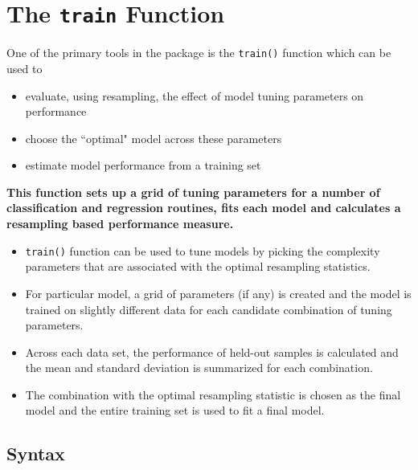 \documentclass[caret-main.tex]{subfiles}
\begin{document}
\section*{The \texttt{train} Function}


One of the primary tools in the package is the \texttt{train()} function which can be used to

\begin{itemize}
\item evaluate, using resampling, the eﬀect of model tuning parameters on performance
\item choose the ``optimal" model across these parameters
\item estimate model performance from a training set
\end{itemize}

\begin{framed}
\noindent \textbf{
This function sets up a grid of tuning parameters for a number of classification and regression routines, fits each model and calculates a resampling based performance measure.
}
\end{framed}

\begin{itemize}
\item \texttt{train()} function can be used to tune models by picking the complexity parameters that are associated with the optimal resampling statistics. 
\item For particular model, a grid of parameters (if any) is created and the model is trained on slightly different data for each candidate combination of tuning parameters. 
\item Across each data set, the performance of held-out samples is calculated and the mean and standard deviation is summarized for each combination. 
\item The combination with the optimal resampling statistic is chosen as the final model and the entire training set is used to fit a final model.
\end{itemize}

\newpage
\subsection*{Syntax}
\end{document}
